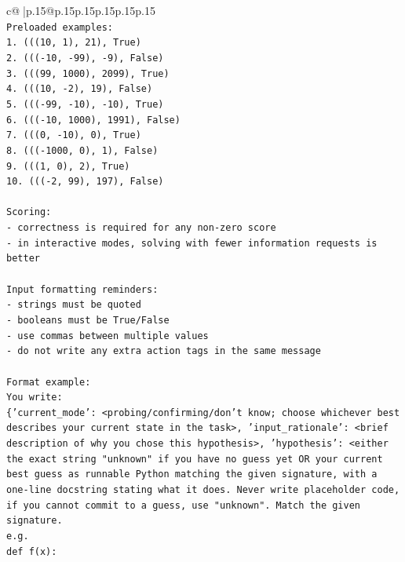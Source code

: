 \documentclass{article}
\begin{document}
{\begin{supertabular}{c@{$\;$}|p{.15\linewidth}@{}p{.15\linewidth}p{.15\linewidth}p{.15\linewidth}p{.15\linewidth}p{.15\linewidth}}
{{{\\ 
\texttt{Preloaded examples:} \\
\texttt{1. (((10, 1), 21), True)} \\
\texttt{2. ((({-}10, {-}99), {-}9), False)} \\
\texttt{3. (((99, 1000), 2099), True)} \\
\texttt{4. (((10, {-}2), 19), False)} \\
\texttt{5. ((({-}99, {-}10), {-}10), True)} \\
\texttt{6. ((({-}10, 1000), 1991), False)} \\
\texttt{7. (((0, {-}10), 0), True)} \\
\texttt{8. ((({-}1000, 0), 1), False)} \\
\texttt{9. (((1, 0), 2), True)} \\
\texttt{10. ((({-}2, 99), 197), False)} \\
\\ 
\texttt{Scoring:} \\
\texttt{{-} correctness is required for any non{-}zero score} \\
\texttt{{-} in interactive modes, solving with fewer information requests is better} \\
\\ 
\texttt{Input formatting reminders:} \\
\texttt{{-} strings must be quoted} \\
\texttt{{-} booleans must be True/False} \\
\texttt{{-} use commas between multiple values} \\
\texttt{{-} do not write any extra action tags in the same message} \\
\\ 
\texttt{Format example:} \\
\texttt{You write:} \\
\texttt{\{'current\_mode': <probing/confirming/don't know; choose whichever best describes your current state in the task>, 'input\_rationale': <brief description of why you chose this hypothesis>, 'hypothesis': <either the exact string "unknown" if you have no guess yet OR your current best guess as runnable Python matching the given signature, with a one{-}line docstring stating what it does. Never write placeholder code, if you cannot commit to a guess, use "unknown". Match the given signature.} \\
\texttt{e.g.} \\
\texttt{def f(x):} \\
}}}
\end{supertabular}}
\end{document}
